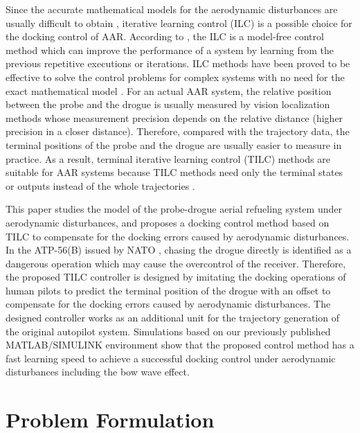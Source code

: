 Since the accurate mathematical models for the aerodynamic disturbances
are usually difficult to obtain \cite{dai2016modeling}, iterative
learning control (ILC) is a possible choice for the docking control
of AAR. According to \cite{bristow2006survey}, the ILC is a model-free
control method which can improve the performance of a system by learning
from the previous repetitive executions or iterations. ILC methods
have been proved to be effective to solve the control problems for
complex systems with no need for the exact mathematical model \cite{ahn2007iterative}.
For an actual AAR system, the relative position between the probe
and the drogue is usually measured by vision localization methods
\cite{valasek2005vision} whose measurement precision depends on the
relative distance (higher precision in a closer distance). Therefore,
compared with the trajectory data, the terminal positions of the probe
and the drogue are usually easier to measure in practice. As a result,
terminal iterative learning control (TILC) methods are suitable for
AAR systems because TILC methods need only the terminal states or
outputs instead of the whole trajectories \cite{chen1999iterative,chi2014improved}. 

This paper studies the model of the probe-drogue aerial refueling
system under aerodynamic disturbances, and proposes a docking control
method based on TILC to compensate for the docking errors caused by
aerodynamic disturbances. In the ATP-56(B) issued by NATO \cite{NATO-2004-3},
chasing the drogue directly is identified as a dangerous operation
which may cause the overcontrol of the receiver. Therefore, the proposed
TILC controller is designed by imitating the docking operations of
human pilots to predict the terminal position of the drogue with an
offset to compensate for the docking errors caused by aerodynamic
disturbances. The designed controller works as an additional unit
for the trajectory generation of the original autopilot system. Simulations
based on our previously published MATLAB/SIMULINK environment \cite{dai2016modeling,wei2016drogue}
show that the proposed control method has a fast learning speed to
achieve a successful docking control under aerodynamic disturbances
including the bow wave effect.

\section{Problem Formulation}

\label{Sec-2}


